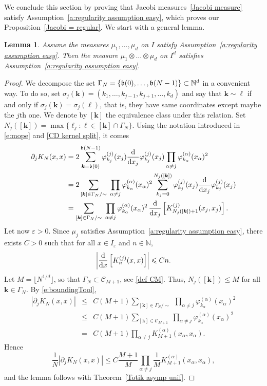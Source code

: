 \documentclass[a4paper,11pt]{article}
\numberwithin{equation}{section}
\newtheorem{lemma}[]{Lemma}
\theoremstyle{definition}
\newcommand{\rev}[1]{#1}
\newcommand{\N}{\mathbb{N}}
\newcommand{\bs}{\boldsymbol}
\renewcommand{\leq}{\leqslant}
\renewcommand{\phi}{\varphi}
\renewcommand{\epsilon}{\varepsilon}
\renewcommand{\d}{ {\rm d}}
\begin{document}
We conclude this section by proving that Jacobi measures~\eqref{Jacobi measure}
satisfy Assumption~\ref{a:regularity assumption easy}, which proves our
Proposition~\ref{Jacobi = regular}. We start with a general lemma.

\begin{lemma} Assume the measures $\mu_1,\dots,\mu_d$ on $I$ satisfy
  Assumption~\ref{a:regularity assumption easy}. Then the measure $\mu_1\otimes\dots\otimes
  \mu_d$ on $I^d$ satisfies Assumption~\ref{a:regularity assumption easy}.
\label{l:separability}
\end{lemma}

\begin{proof}
We decompose the set $\Gamma_N = \{\frak b(0),\ldots,\frak b(N-1)\}\subset \N^d$ in a
convenient way. To do so, set $\sigma_j(\bs
k)=(k_1,\ldots,k_{j-1},k_{j+1},\ldots,k_d)$ and say that $\bs k\sim \bs \ell$ if
and only if $\sigma_j(\bs k)=\sigma_j( \bs \ell)$, that is, they have same
coordinates except maybe the $j$th one. We denote by $[\bs k]$ the equivalence
class under this relation. Set $N_j([\bs k])=\max\{\ell_j : \bs \ell\in[\bs
k]\cap\Gamma_N\}$. Using the notation introduced in \eqref{e:mope} and \eqref{CD kernel
  split}, it comes
\begin{align}
\partial_j K_N(x,x) & =2\sum_{\bs k=\frak b(0)}^{\frak b(N-1)}\phi_{k_j}^{(j)}(x_j)\frac{\d}{\d x_j}\phi_{k_j}^{(j)}(x_j)\prod_{\alpha\neq j}\phi_{k_\alpha}^{(\alpha)}(x_\alpha)^2\nonumber\\
& = 2\sum_{[\bs k] \in \Gamma_N/\sim}\;\prod_{\alpha\neq j}\phi^{(\alpha)}_{k_\alpha}(x_\alpha)^2 \sum_{k_j=0}^{N_j([\bs k])}\phi_{k_j}^{(j)}(x_j)\frac{\d}{\d x_j}\phi_{k_j}^{(j)}(x_j)\nonumber\\
&= \sum_{[\bs k] \in \Gamma_N/\sim}\;\prod_{\alpha\neq j}\phi^{(\alpha)}_{k_\alpha}(x_\alpha)^2 \, \frac{\d}{\d x_j} \left[ K^{(j)}_{N_j([\bs k])+1}(x_j,x_j)\right].\label{e:boundingTool}
\end{align}
Let now $\epsilon>0$. Since $\mu_j$ satisfies Assumption~\ref{a:regularity
  assumption easy}, there exists $C>0$ such that for all $x\in I_\epsilon$ and $n\in\mathbb{N}$,
$$ \left\vert \frac{\d}{\d x} \left[ K^{(j)}_{n}(x,x)\right]\right\vert \leq Cn. $$
Let $M=\lfloor N^{1/d}\rfloor$, so that $\Gamma_N\subset \mathcal{C}_{M+1}$, see
\eqref{def CM}. Thus, $N_j([\bs k])\leq M$ for all $\bs k\in \Gamma_N$. By \eqref{e:boundingTool},
\begin{eqnarray*}
\left\vert \partial_j K_N(x,x)\right\vert &\leq& C  (M+1) \sum_{[\bs k] \in
  \Gamma_N/\sim}\;\prod_{\alpha\neq j}\phi^{(\alpha)}_{k_\alpha}(x_\alpha)^2\\
&\leq&  C (M+1) \sum_{[\bs k] \in \mathcal{C}_{M+1}}\;\prod_{\alpha\neq
       j}\phi^{(\alpha)}_{k_\alpha}(x_\alpha)^2\\
&=& C (M+1) \prod_{\alpha\neq j} K_{M+1}^{(\alpha)}(x_\alpha,x_\alpha).
\end{eqnarray*}
Hence
$$
\frac 1N \left\vert \partial_j K_N(x,x)\right\vert \leq C \frac{M+1}{M}\prod_{\alpha\neq j} \frac{1}{M}K_{M+1}^{(\alpha)}(x_\alpha,x_\alpha),
$$
\rev{and the lemma follows with Theorem~\ref{Totik asymp unif}.}
\end{proof}
\end{document}
